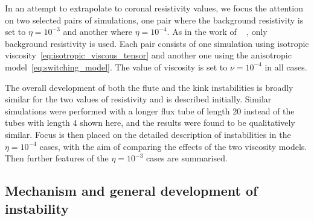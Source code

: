 \documentclass[fleqn,usenatbib]{mnras}
\newcommand{\rev}[1]{{\color{red} {#1}}}
\newcommand{\revcite}[1]{{\color{red} \underline{#1}}}
\begin{document}
\rev{In an attempt to extrapolate to coronal resistivity values,} we
focus the attention on two selected pairs of  simulations, one pair
where the background resistivity is set to $\eta=10^{-3}$ and another where
$\eta=10^{-4}$. As in the work of ~\revcite{\citet{quinnEffectAnisotropicViscosity2020}}, only
background resistivity is used. Each pair consists of one simulation using
isotropic viscosity~\eqref{eq:isotropic_viscous_tensor} and another one using
the anisotropic model~\eqref{eq:switching_model}. The value of viscosity is set
to $\nu = 10^{-4}$ in all cases. 

The overall development of both the flute and the kink instabilities is broadly
similar for the two values of resistivity and is described  initially. Similar
simulations were performed with a longer flux tube of length $20$ instead of
the tubes with length $4$ shown here, and the results were found to be
qualitatively similar. Focus is then placed on the detailed description of
instabilities in the $\eta=10^{-4}$ cases, with the aim of comparing the
effects of the two viscosity models. Then further features of the
$\eta=10^{-3}$ cases are summarised.

\subsection{Mechanism and
    general development of instability}
\end{document}
